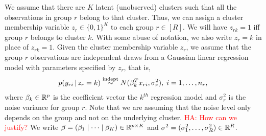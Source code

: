 \documentclass[12pt]{article}
\begin{document}
We assume that there are $K$ latent (unobserved) clusters such that all the observations in group $r$ belong to that cluster. Thus, we can assign a cluster membership variable $z_{r} \in \{0,1\}^K$ to each group $r \in [R]$. We will have $z_{rk} = 1$ iff group $r$ belongs to cluster $k$.  With some abuse of notation, we also write $z_r = k$ in place of $z_{rk} = 1$.
%
%
%
%
Given the cluster membership variable $z_r$, we assume that the group $r$ observations are independent draws from a Gaussian linear regression model with parameters specified by $z_r$, that is,
\begin{align}\label{eq:gauss:mixreg:model}
	p(y_{ri} \,|\, z_{r} = k) \stackrel{\text{indept}}{\sim } N( \beta_k^T x_{ri}, \sigma_r^2), \; i =1,\dots,n_r,
\end{align}
where $\beta_k \in \mathbb{R}^p$ is the coefficient vector the $k^{th}$ regression model and $\sigma_r^2$ is the noise variance for group $r$. Note that we are assuming that the noise level only depends on the group and not on the underlying cluster.  \textcolor{red}{HA: How can we justify?} We write $\beta = (\beta_1 \mid \dots \mid \beta_K) \in \mathbb{R}^{p \times K}$ and $\sigma^2 = (\sigma_1^2,\dots,\sigma_R^2) \in \mathbb{R}^R$.
\end{document}
